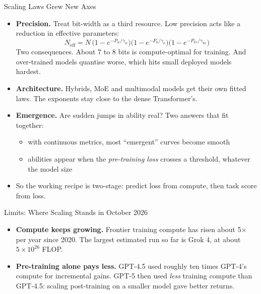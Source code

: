 \begin{frame}{Scaling Laws Grew New Axes}
    \begin{itemize}\itemsep0.39em
        \item \textbf{Precision.} Treat bit-width as a third resource. Low precision acts like a reduction in effective parameters:
        \[
            N_{\text{eff}} = N\,\big(1-e^{-P_w/\gamma_w}\big)\big(1-e^{-P_a/\gamma_a}\big)\big(1-e^{-P_{kv}/\gamma_{kv}}\big)
        \]
        Two consequences. About 7 to 8 bits is compute-optimal for training. And \alert{over-trained models quantise worse}, which hits small deployed models hardest.
        \item \textbf{Architecture.} Hybrids, MoE and multimodal models get their own fitted laws. The exponents stay close to the dense Transformer's.
        \item \textbf{Emergence.} Are sudden jumps in ability real? Two answers that fit together:
        \begin{itemize}\itemsep0.13em
            \item with continuous metrics, most ``emergent'' curves become smooth
            \item abilities appear when the \emph{pre-training loss} crosses a threshold, whatever the model size
        \end{itemize}
        \item So the working recipe is two-stage: predict loss from compute, then task score from loss.
    \end{itemize}
\end{frame}

\begin{frame}{Limits: Where Scaling Stands in October 2026}
    \begin{itemize}\itemsep0.36em
        \item \textbf{Compute keeps growing.} Frontier training compute has risen about 5$\times$ per year since 2020. The largest estimated run so far is Grok 4, at about $5\times10^{26}$ FLOP.
        \item \textbf{Pre-training alone pays less.} GPT-4.5 used roughly ten times GPT-4's compute for incremental gains. GPT-5 then used \emph{less} training compute than GPT-4.5: scaling post-training on a smaller model gave better returns.
    \end{itemize}
    \vspace{0.3em}
\end{frame}

